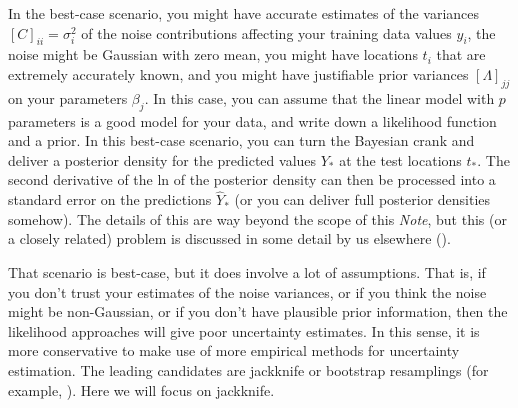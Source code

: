 \documentclass[12pt,letterpaper]{article}
\newcommand{\documentname}{\textsl{Note}}
\begin{document}
In the best-case scenario, you might have accurate estimates of the variances $[C]_{ii} = \sigma_i^2$ of the noise contributions affecting your training data values $y_i$, the noise might be Gaussian with zero mean, you might have locations $t_i$ that are extremely accurately known, and you might have justifiable prior variances $[\Lambda]_{jj}$ on your parameters $\beta_j$.
In this case, you can assume that the linear model with $p$ parameters is a good model for your data, and write down a likelihood function and a prior.
In this best-case scenario, you can turn the Bayesian crank and deliver a posterior density for the predicted values $Y_\ast$ at the test locations $t_\ast$.
The second derivative of the ln of the posterior density can then be processed into a standard error on the predictions $\hat{Y}_\ast$ (or you can deliver full posterior densities somehow).
The details of this are way beyond the scope of this \documentname, but this (or a closely related) problem is discussed in some detail by us elsewhere (\citealt{products}).

That scenario is best-case, but it does involve a lot of assumptions.
That is, if you don't trust your estimates of the noise variances, or if you think the noise might be non-Gaussian, or if you don't have plausible prior information, then the likelihood approaches will give poor uncertainty estimates.
In this sense, it is more conservative to make use of more empirical methods for uncertainty estimation.
The leading candidates are jackknife or bootstrap resamplings (for example, \citealt{bootjack}).
Here we will focus on jackknife.
\end{document}
